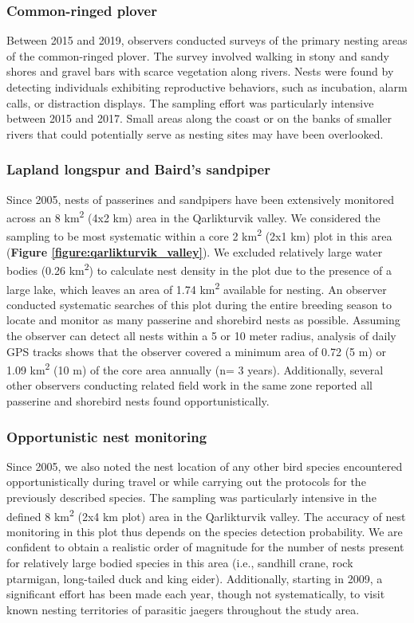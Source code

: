 \documentclass[a4paper,twoside,10pt]{article}
\begin{document}
\subsubsection*{Common-ringed plover}
Between 2015 and 2019, observers conducted surveys of the primary nesting areas of the common-ringed plover. The survey involved walking in stony and sandy shores and gravel bars with scarce vegetation along rivers. Nests were found by detecting individuals exhibiting reproductive behaviors, such as incubation, alarm calls, or distraction displays. The sampling effort was particularly intensive between 2015 and 2017. Small areas along the coast or on the banks of smaller rivers that could potentially serve as nesting sites may have been overlooked.

\subsubsection*{Lapland longspur and Baird's sandpiper}
Since 2005, nests of passerines and sandpipers have been extensively monitored across an 8 km\textsuperscript{2} (4x2 km) area in the Qarlikturvik valley. We considered the sampling to be most systematic within a core 2 km\textsuperscript{2} (2x1 km) plot in this area (\textbf{Figure \ref{figure:qarlikturvik_valley}}). We excluded relatively large water bodies (0.26 km\textsuperscript{2}) to calculate nest density in the plot due to the presence of a large lake, which leaves an area of 1.74 km\textsuperscript{2} available for nesting. An observer conducted systematic searches of this plot during the entire breeding season to locate and monitor as many passerine and shorebird nests as possible. Assuming the observer can detect all nests within a 5 or 10 meter radius, analysis of daily GPS tracks shows that the observer covered a minimum area of 0.72  (5 m) or 1.09  km\textsuperscript{2} (10 m) of the core area annually (n= 3 years). Additionally, several other observers conducting related field work in the same zone reported all passerine and shorebird nests found opportunistically. 


\newpage

\subsubsection{Opportunistic nest monitoring}
Since 2005, we also noted the nest location of any other bird species encountered opportunistically during travel or while carrying out the protocols for the previously described species. The sampling was particularly intensive in the defined 8 km\textsuperscript{2} (2x4 km plot) area in the Qarlikturvik valley. The accuracy of nest monitoring in this plot thus depends on the species detection probability. We are confident to obtain a realistic order of magnitude for the number of nests present for relatively large bodied species in this area (i.e., sandhill crane, rock ptarmigan, long-tailed duck and king eider). Additionally, starting in 2009, a significant effort has been made each year, though not systematically, to visit known nesting territories of parasitic jaegers throughout the study area.
\end{document}
